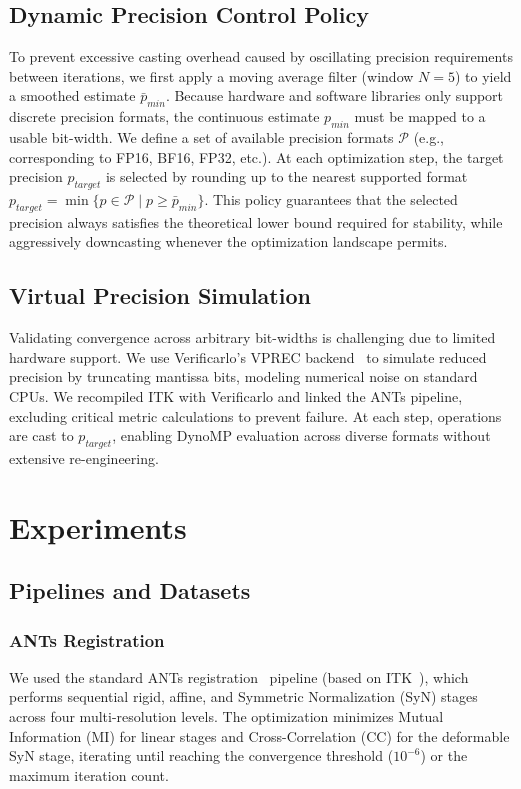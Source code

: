 \documentclass[runningheads]{llncs}
\begin{document}
\subsection{Dynamic Precision Control Policy}
To prevent excessive casting overhead caused by oscillating precision
requirements between iterations, we first apply a moving average filter (window
$N=5$) to yield a smoothed estimate $\bar{p}_{min}$. Because hardware and
software libraries only support discrete precision formats, the continuous
estimate $p_{min}$ must be mapped to a usable bit-width. We define a set of
available precision formats $\mathcal{P}$ (e.g., corresponding to FP16, BF16,
FP32, etc.). At each optimization step, the target precision $p_{target}$ is
selected by rounding up to the nearest supported format $p_{target} = \min \{ p
\in \mathcal{P} \mid p \ge \bar{p}_{min} \}$. This policy guarantees that the
selected precision always satisfies the theoretical lower bound required for
stability, while aggressively downcasting whenever the optimization landscape
permits.

\subsection{Virtual Precision Simulation}
Validating convergence across arbitrary bit-widths is challenging due to limited hardware support. We use Verificarlo's VPREC backend~\cite{Chatelain2019-vw} to simulate reduced precision by truncating mantissa bits, modeling numerical noise on standard CPUs. We recompiled ITK with Verificarlo and linked the ANTs pipeline, excluding critical metric calculations to prevent failure. At each step, operations are cast to $p_{target}$, enabling DynoMP evaluation across diverse formats without extensive re-engineering.

\section{Experiments}
\subsection{Pipelines and Datasets}
\subsubsection{ANTs Registration}
We used the standard ANTs registration~\cite{Avants2008-ea} pipeline (based on
ITK~\cite{McCormick2014-ok, Yoo2002-ve}), which performs sequential rigid,
affine, and Symmetric Normalization (SyN) stages across four multi-resolution
levels. The optimization minimizes Mutual Information (MI) for linear stages and
Cross-Correlation (CC) for the deformable SyN stage, iterating until reaching the convergence threshold
($10^{-6}$) or the maximum iteration count.
\end{document}
